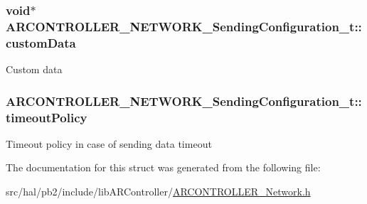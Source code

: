 \subsubsection[{\texorpdfstring{custom\+Data}{customData}}]{\setlength{\rightskip}{0pt plus 5cm}void$\ast$ A\+R\+C\+O\+N\+T\+R\+O\+L\+L\+E\+R\+\_\+\+N\+E\+T\+W\+O\+R\+K\+\_\+\+Sending\+Configuration\+\_\+t\+::custom\+Data}\hypertarget{struct_a_r_c_o_n_t_r_o_l_l_e_r___n_e_t_w_o_r_k___sending_configuration__t_a2cbbadc2a500c2ac5ed173befcdfb6ba}{}\label{struct_a_r_c_o_n_t_r_o_l_l_e_r___n_e_t_w_o_r_k___sending_configuration__t_a2cbbadc2a500c2ac5ed173befcdfb6ba}
Custom data 
\subsubsection[{\texorpdfstring{timeout\+Policy}{timeoutPolicy}}]{ A\+R\+C\+O\+N\+T\+R\+O\+L\+L\+E\+R\+\_\+\+N\+E\+T\+W\+O\+R\+K\+\_\+\+Sending\+Configuration\+\_\+t\+::timeout\+Policy}\hypertarget{struct_a_r_c_o_n_t_r_o_l_l_e_r___n_e_t_w_o_r_k___sending_configuration__t_a77b199bd1bc87731add70ed10ac70521}{}\label{struct_a_r_c_o_n_t_r_o_l_l_e_r___n_e_t_w_o_r_k___sending_configuration__t_a77b199bd1bc87731add70ed10ac70521}
Timeout policy in case of sending data timeout 

The documentation for this struct was generated from the following file\+:\begin{DoxyCompactItemize}
\item 
src/hal/pb2/include/lib\+A\+R\+Controller/\hyperlink{_a_r_c_o_n_t_r_o_l_l_e_r___network_8h}{A\+R\+C\+O\+N\+T\+R\+O\+L\+L\+E\+R\+\_\+\+Network.\+h}\end{DoxyCompactItemize}
